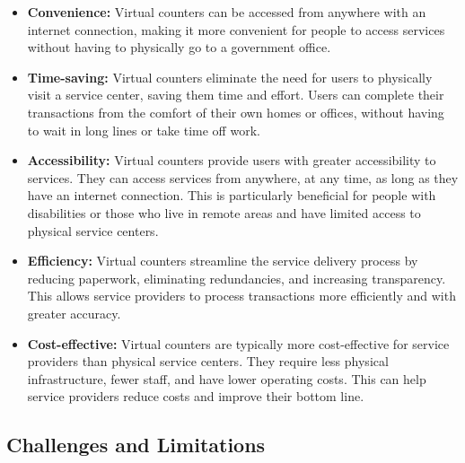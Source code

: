 \begin{itemize}
    
\item \textbf{Convenience:}  Virtual counters can be accessed from anywhere with an internet connection, making it more convenient for people to access services without having to physically go to a government office.
\item \textbf{Time-saving:} Virtual counters eliminate the need for users to physically visit a service center, saving them time and effort. Users can complete their transactions from the comfort of their own homes or offices, without having to wait in long lines or take time off work.
\item \textbf{Accessibility:} Virtual counters provide users with greater accessibility to services. They can access services from anywhere, at any time, as long as they have an internet connection. This is particularly beneficial for people with disabilities or those who live in remote areas and have limited access to physical service centers.
\item \textbf{Efficiency:} Virtual counters streamline the service delivery process by reducing paperwork, eliminating redundancies, and increasing transparency. This allows service providers to process transactions more efficiently and with greater accuracy.
\item \textbf{Cost-effective:} Virtual counters are typically more cost-effective for service providers than physical service centers. They require less physical infrastructure, fewer staff, and have lower operating costs. This can help service providers reduce costs and improve their bottom line.
\end{itemize}

\subsection{Challenges and Limitations}

